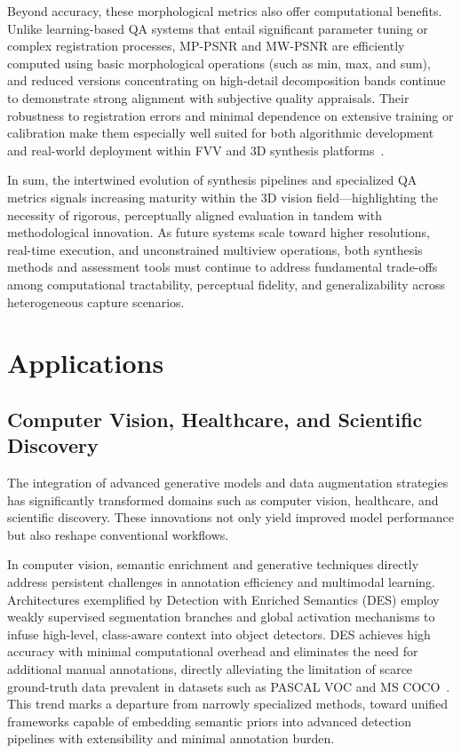 \documentclass[sigconf]{acmart}
\begin{document}
Beyond accuracy, these morphological metrics also offer computational benefits. Unlike learning-based QA systems that entail significant parameter tuning or complex registration processes, MP-PSNR and MW-PSNR are efficiently computed using basic morphological operations (such as min, max, and sum), and reduced versions concentrating on high-detail decomposition bands continue to demonstrate strong alignment with subjective quality appraisals. Their robustness to registration errors and minimal dependence on extensive training or calibration make them especially well suited for both algorithmic development and real-world deployment within FVV and 3D synthesis platforms~\cite{refQARef99}.

In sum, the intertwined evolution of synthesis pipelines and specialized QA metrics signals increasing maturity within the 3D vision field—highlighting the necessity of rigorous, perceptually aligned evaluation in tandem with methodological innovation. As future systems scale toward higher resolutions, real-time execution, and unconstrained multiview operations, both synthesis methods and assessment tools must continue to address fundamental trade-offs among computational tractability, perceptual fidelity, and generalizability across heterogeneous capture scenarios.

\section{Applications}

\subsection{Computer Vision, Healthcare, and Scientific Discovery}

The integration of advanced generative models and data augmentation strategies has significantly transformed domains such as computer vision, healthcare, and scientific discovery. These innovations not only yield improved model performance but also reshape conventional workflows.

In computer vision, semantic enrichment and generative techniques directly address persistent challenges in annotation efficiency and multimodal learning. Architectures exemplified by Detection with Enriched Semantics (DES) employ weakly supervised segmentation branches and global activation mechanisms to infuse high-level, class-aware context into object detectors. DES achieves high accuracy with minimal computational overhead and eliminates the need for additional manual annotations, directly alleviating the limitation of scarce ground-truth data prevalent in datasets such as PASCAL VOC and MS COCO~\cite{ref61}. This trend marks a departure from narrowly specialized methods, toward unified frameworks capable of embedding semantic priors into advanced detection pipelines with extensibility and minimal annotation burden.
\end{document}
